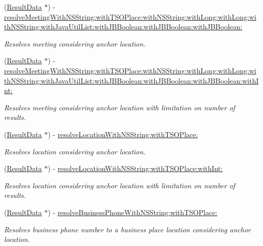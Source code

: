 \begin{DoxyCompactItemize}
\item 
(\hyperlink{interface_result_data}{Result\+Data} $\ast$) -\/ \hyperlink{protocol_i_resolver-p_a64f13423e873757a34152f6fb911fbbf}{resolve\+Meeting\+With\+N\+S\+String\+:with\+T\+S\+O\+Place\+:with\+N\+S\+String\+:with\+Long\+:with\+Long\+:with\+N\+S\+String\+:with\+Java\+Util\+List\+:with\+J\+B\+Boolean\+:with\+J\+B\+Boolean\+:with\+J\+B\+Boolean\+:}
\begin{DoxyCompactList}\small\item\em Resolves meeting considering anchor location. \end{DoxyCompactList}\item 
(\hyperlink{interface_result_data}{Result\+Data} $\ast$) -\/ \hyperlink{protocol_i_resolver-p_aca1ba0ea3193d76edae98216cd4c05be}{resolve\+Meeting\+With\+N\+S\+String\+:with\+T\+S\+O\+Place\+:with\+N\+S\+String\+:with\+Long\+:with\+Long\+:with\+N\+S\+String\+:with\+Java\+Util\+List\+:with\+J\+B\+Boolean\+:with\+J\+B\+Boolean\+:with\+J\+B\+Boolean\+:with\+Int\+:}
\begin{DoxyCompactList}\small\item\em Resolves meeting considering anchor location with limitation on number of results. \end{DoxyCompactList}\item 
(\hyperlink{interface_result_data}{Result\+Data} $\ast$) -\/ \hyperlink{protocol_i_resolver-p_af44d787a238c840c8fdb56f71c9af936}{resolve\+Location\+With\+N\+S\+String\+:with\+T\+S\+O\+Place\+:}
\begin{DoxyCompactList}\small\item\em Resolves location considering anchor location. \end{DoxyCompactList}\item 
(\hyperlink{interface_result_data}{Result\+Data} $\ast$) -\/ \hyperlink{protocol_i_resolver-p_af5af5c59ed1655ec4682fb64dc7e1dc6}{resolve\+Location\+With\+N\+S\+String\+:with\+T\+S\+O\+Place\+:with\+Int\+:}
\begin{DoxyCompactList}\small\item\em Resolves location considering anchor location with limitation on number of results. \end{DoxyCompactList}\item 
(\hyperlink{interface_result_data}{Result\+Data} $\ast$) -\/ \hyperlink{protocol_i_resolver-p_ad9e33525a1aba63b9a7d2ba99dcc9cc3}{resolve\+Business\+Phone\+With\+N\+S\+String\+:with\+T\+S\+O\+Place\+:}
\begin{DoxyCompactList}\small\item\em Resolves business phone number to a business place location considering anchor location. \end{DoxyCompactList}\item 

\end{DoxyCompactItemize}
